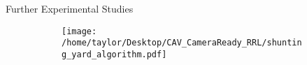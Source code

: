 \documentclass[
    hyperref = {hidelinks, linkcolor = black},
    xcolor = {dvipsnames},
    10pt
    aspectration = 169
]{beamer}
\begin{document}
\begin{frame}{Further Experimental Studies}
\begin{figure}
                    \begin{subfigure}[T]{0.25\linewidth}
                        \centering
                    \end{subfigure}
                    \hspace{1cm}
                    \begin{subfigure}[T]{0.4\linewidth}
                        \texttt{[image: /home/taylor/Desktop/CAV\_CameraReady\_RRL/shunting\_yard\_algorithm.pdf]}
                    \end{subfigure}
                \end{figure}


\end{frame}
\end{document}
